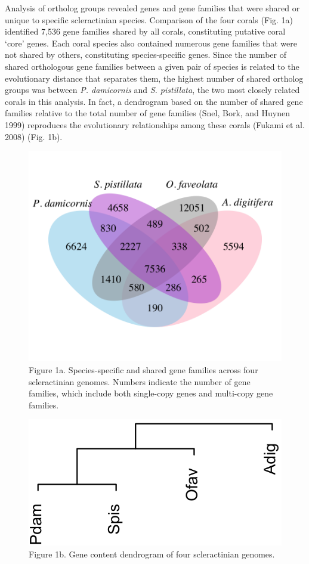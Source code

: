 \documentclass[]{elsarticle} %
\makeatletter
\def\maxwidth{\ifdim\Gin@nat@width>\linewidth\linewidth
\else\Gin@nat@width\fi}
\let\Oldincludegraphics\includegraphics
\renewcommand{\includegraphics}[1]{\Oldincludegraphics[width=\maxwidth]{#1}}
\makeatother
\begin{document}
Analysis of ortholog groups revealed genes and gene families that were
shared or unique to specific scleractinian species. Comparison of the
four corals (Fig. 1a) identified 7,536 gene families shared by all
corals, constituting putative coral `core' genes. Each coral species
also contained numerous gene families that were not shared by others,
constituting species-specific genes. Since the number of shared
orthologous gene families between a given pair of species is related to
the evolutionary distance that separates them, the highest number of
shared ortholog groups was between \emph{P. damicornis} and \emph{S.
pistillata}, the two most closely related corals in this analysis. In
fact, a dendrogram based on the number of shared gene families relative
to the total number of gene families (Snel, Bork, and Huynen 1999)
reproduces the evolutionary relationships among these corals (Fukami et
al. 2008) (Fig. 1b).

\begin{figure}
\centering
\includegraphics{../figures/coral_venn.png}
\caption{Figure 1a. Species-specific and shared gene families across
four scleractinian genomes. Numbers indicate the number of gene
families, which include both single-copy genes and multi-copy gene
families.}
\end{figure}

\begin{figure}
\centering
\includegraphics{../figures/coral_genecontent_dendro.png}
\caption{Figure 1b. Gene content dendrogram of four scleractinian
genomes.}
\end{figure}
\end{document}
